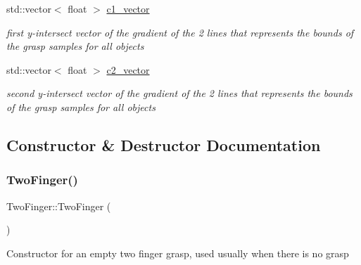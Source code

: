\begin{DoxyCompactItemize}
\mbox{\label{classTwoFinger_a5ed3318155737fe2f9cd07118864595f}} 
std\+::vector$<$ float $>$ \hyperlink{classTwoFinger_a5ed3318155737fe2f9cd07118864595f}{c1\+\_\+vector}
\begin{DoxyCompactList}\small\item\em first y-\/intersect vector of the gradient of the 2 lines that represents the bounds of the grasp samples for all objects \end{DoxyCompactList}\item 
\mbox{\label{classTwoFinger_afdf53c9910ad01f1b6db85da3ae71cfd}} 
std\+::vector$<$ float $>$ \hyperlink{classTwoFinger_afdf53c9910ad01f1b6db85da3ae71cfd}{c2\+\_\+vector}
\begin{DoxyCompactList}\small\item\em second y-\/intersect vector of the gradient of the 2 lines that represents the bounds of the grasp samples for all objects \end{DoxyCompactList}\end{DoxyCompactItemize}


\subsection{Constructor \& Destructor Documentation}
\mbox{\label{classTwoFinger_a17e7b3ee5b7e21d99b99968c9c14ac87}} 
\subsubsection{\texorpdfstring{Two\+Finger()}{TwoFinger()}\hspace{0.1cm}{\footnotesize\ttfamily [1/2]}}
{\footnotesize\ttfamily Two\+Finger\+::\+Two\+Finger (\begin{DoxyParamCaption}{ }\end{DoxyParamCaption})\hspace{0.3cm}{\ttfamily [inline]}}

Constructor for an empty two finger grasp, used usually when there is no grasp \mbox{\label{classTwoFinger_ab0708e05d9ebf755745c14293cf6ddca}} 
